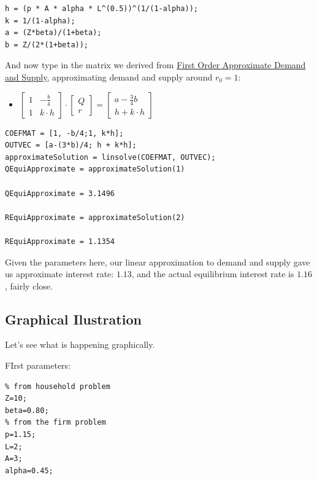 \documentclass[
]{book}
\providecommand{\tightlist}{%
  \setlength{\itemsep}{0pt}\setlength{\parskip}{0pt}}
\begin{document}
\begin{verbatim}
h = (p * A * alpha * L^(0.5))^(1/(1-alpha));
k = 1/(1-alpha);
a = (Z*beta)/(1+beta);
b = Z/(2*(1+beta));
\end{verbatim}

And now type in the matrix we derived from \href{https://fanwangecon.github.io/Math4Econ/matrix_application/demand_supply_taylor_approximate.html}{First Order Approximate
Demand and
Supply},
approximating demand and supply around \(r_0 =1\):

\begin{itemize}
\tightlist
\item
  \(\displaystyle \left\lbrack \begin{array}{cc} 1 & -\frac{b}{4}\\ 1 & k\cdot h \end{array}\right\rbrack \cdot \left\lbrack \begin{array}{c} Q\\ r \end{array}\right\rbrack =\left\lbrack \begin{array}{c} a-\frac{3}{4}b\\ h+k\cdot h \end{array}\right\rbrack\)
\end{itemize}

\begin{verbatim}
COEFMAT = [1, -b/4;1, k*h];
OUTVEC = [a-(3*b)/4; h + k*h];
approximateSolution = linsolve(COEFMAT, OUTVEC);
QEquiApproximate = approximateSolution(1)

QEquiApproximate = 3.1496

REquiApproximate = approximateSolution(2)

REquiApproximate = 1.1354
\end{verbatim}

Given the parameters here, our linear approximation to demand and supply
gave us approximate interest rate: \(1.13\), and the actual equilibrium
interest rate is \(1.16\), fairly close.

\hypertarget{graphical-ilustration}{%
\subsection{Graphical Ilustration}\label{graphical-ilustration}}

Let's see what is happening graphically.

FIrst parameters:

\begin{verbatim}
% from household problem
Z=10;
beta=0.80;
% from the firm problem
p=1.15;
L=2; 
A=3; 
alpha=0.45;
\end{verbatim}
\end{document}
